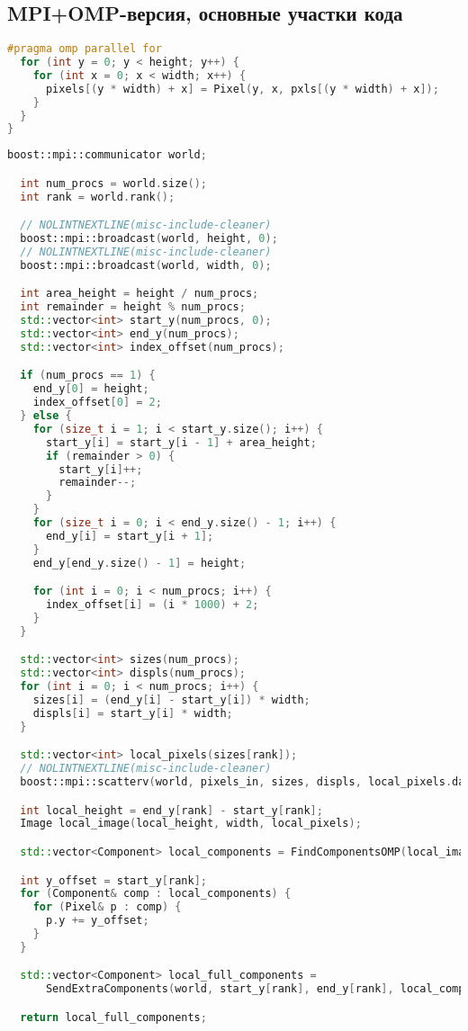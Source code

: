 \documentclass[12pt]{article}
\begin{document}
\newpage

\subsection{MPI+OMP-версия, основные участки кода}
\label{appendix:mpi_1}
\begin{lstlisting}[language=C++, caption={MPI+OMP-версия, Создание объекта Image в конструкторе Image::Image()}]
#pragma omp parallel for
  for (int y = 0; y < height; y++) {
    for (int x = 0; x < width; x++) {
      pixels[(y * width) + x] = Pixel(y, x, pxls[(y * width) + x]);
    }
  }
}
\end{lstlisting}
\label{appendix:mpi_2}
\begin{lstlisting}[language=C++, caption={MPI+OMP-версия, Поиск компонент в локальном изображении процесса в функции FindComponentsMPIOMP()}]
  boost::mpi::communicator world;

  int num_procs = world.size();
  int rank = world.rank();

  // NOLINTNEXTLINE(misc-include-cleaner)
  boost::mpi::broadcast(world, height, 0);
  // NOLINTNEXTLINE(misc-include-cleaner)
  boost::mpi::broadcast(world, width, 0);

  int area_height = height / num_procs;
  int remainder = height % num_procs;
  std::vector<int> start_y(num_procs, 0);
  std::vector<int> end_y(num_procs);
  std::vector<int> index_offset(num_procs);

  if (num_procs == 1) {
    end_y[0] = height;
    index_offset[0] = 2;
  } else {
    for (size_t i = 1; i < start_y.size(); i++) {
      start_y[i] = start_y[i - 1] + area_height;
      if (remainder > 0) {
        start_y[i]++;
        remainder--;
      }
    }
    for (size_t i = 0; i < end_y.size() - 1; i++) {
      end_y[i] = start_y[i + 1];
    }
    end_y[end_y.size() - 1] = height;

    for (int i = 0; i < num_procs; i++) {
      index_offset[i] = (i * 1000) + 2;
    }
  }

  std::vector<int> sizes(num_procs);
  std::vector<int> displs(num_procs);
  for (int i = 0; i < num_procs; i++) {
    sizes[i] = (end_y[i] - start_y[i]) * width;
    displs[i] = start_y[i] * width;
  }

  std::vector<int> local_pixels(sizes[rank]);
  // NOLINTNEXTLINE(misc-include-cleaner)
  boost::mpi::scatterv(world, pixels_in, sizes, displs, local_pixels.data(), static_cast<int>(local_pixels.size()), 0);

  int local_height = end_y[rank] - start_y[rank];
  Image local_image(local_height, width, local_pixels);

  std::vector<Component> local_components = FindComponentsOMP(local_image);

  int y_offset = start_y[rank];
  for (Component& comp : local_components) {
    for (Pixel& p : comp) {
      p.y += y_offset;
    }
  }

  std::vector<Component> local_full_components =
      SendExtraComponents(world, start_y[rank], end_y[rank], local_components);

  return local_full_components;
\end{lstlisting}
\end{document}
